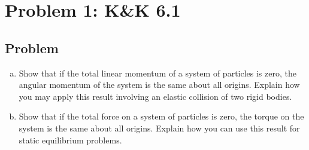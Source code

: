 \documentclass[solutions]{esg8012pset}
\date{Month Day\csname latex@error\endcsname {Date not yet decided}}
\begin{document}
\section*{Problem 1: K\&K 6.1}
\subsection*{Problem}
  \begin{enumerate}[(a)]
    \item Show that if the total linear momentum of a system of particles is zero, the angular momentum of the system is the same about all origins. Explain how you may apply this result involving an elastic collision of two rigid bodies.
    \item Show that if the total force on a system of particles is zero, the torque on the system is the same about all origins. Explain how you can use this result for static equilibrium problems.
  \end{enumerate}
\end{document}
